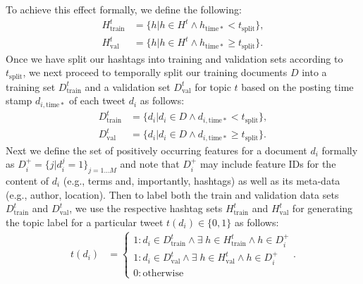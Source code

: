 \begin{enumerate}
To achieve this effect formally, we define the following:
\begin{align*}
H^t_\mathrm{train} & = \{ h | h \in H^t \land h_\mathrm{time*} <    t_\mathrm{split} \} ,  \\
H^t_\mathrm{val}   & = \{ h | h \in H^t \land h_\mathrm{time*} \geq t_\mathrm{split} \} .
\end{align*}
Once we have split our hashtags into training and validation sets
according to $t_\mathrm{split}$, we next proceed to temporally split
our training documents $D$ into a training set $D^t_\mathrm{train}$ and a validation set
$D^t_\mathrm{val}$ for topic $t$ based on the posting
time stamp $d_{i,\mathrm{time*}}$ of each tweet $d_i$ as follows: 
\begin{align*}
D^t_\mathrm{train} & = \{ d_i | d_i \in D \land d_{i,\mathrm{time*}} <    t_\mathrm{split} \} ,  \\
D^t_\mathrm{val}   & = \{ d_i | d_i \in D \land d_{i,\mathrm{time*}} \geq t_\mathrm{split} \} .
\end{align*}
Next we define the set of positively occurring features for a document
$d_i$ formally as $D_i^+ = \{ j | d_i^j=1 \}_{j=1\ldots M}$ and note that
$D_i^+$ may include feature IDs for the content of $d_i$ (e.g., terms and, importantly, 
hashtags) as well as its meta-data (e.g., author, location).
Then to label both the train and validation data sets $D^t_\mathrm{train}$ and $D^t_\mathrm{val}$, 
we use the respective
hashtag sets $H^t_\mathrm{train}$ and $H^t_\mathrm{val}$ for generating
the topic label for a particular tweet $t(d_{i}) \in \{0,1\}$ as follows:
\begin{align*}
t(d_{i}) & =
  \begin{cases}
    1: d_{i} \in D^t_\mathrm{train} \land \exists \; h \in H^t_\mathrm{train} \land h \in D_i^+ \\
    1: d_{i} \in D^t_\mathrm{val} \land \exists \; h \in H^t_\mathrm{val} \land h \in D_i^+ \\
    0: \mathrm{otherwise}
  \end{cases} .
\end{align*}


\end{enumerate}
